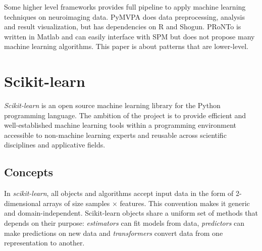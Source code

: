\documentclass{frontiersSCNS} %
\begin{document}
Some higher level frameworks provides full pipeline to apply machine learning techniques on
neuroimaging data. PyMVPA does data preprocessing, analysis and result
visualization, but has dependencies on R and Shogun. PRoNTo
\citep{schrouff2013pronto} is written in Matlab and can easily interface with
SPM but does not propose many machine learning algorithms. This paper is about
patterns that are lower-level.

\section{Scikit-learn}
\label{scikitlearn}

{\em Scikit-learn} \citep{pedregosa2011} is an open source machine
learning library for the Python programming language. The ambition of the
project is to provide efficient and well-established machine learning tools within
a programming environment accessible to non-machine learning experts
and reusable across scientific disciplines and applicative fields.

\subsection{Concepts}

In {\em scikit-learn}, all objects and algorithms accept input data in the form of
2-dimensional arrays of size samples $\times$ features.
This convention makes it generic and domain-independent.
Scikit-learn objects share a uniform set of methods that
depends on their purpose: \textit{estimators} can fit models from data,
\textit{predictors} can make predictions on new data and \textit{transformers}
convert data from one representation to another.
\end{document}
